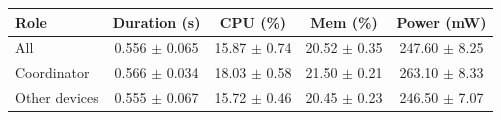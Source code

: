 \begin{tabular}{lcccc}
\hline
\textbf{Role} & \textbf{Duration (s)} & \textbf{CPU (\%)} & \textbf{Mem (\%)} & \textbf{Power (mW)} \\
\hline
All & 0.556 $\pm$ 0.065 & 15.87 $\pm$ 0.74 & 20.52 $\pm$ 0.35 & 247.60 $\pm$ 8.25 \\
Coordinator & 0.566 $\pm$ 0.034 & 18.03 $\pm$ 0.58 & 21.50 $\pm$ 0.21 & 263.10 $\pm$ 8.33 \\
Other devices & 0.555 $\pm$ 0.067 & 15.72 $\pm$ 0.46 & 20.45 $\pm$ 0.23 & 246.50 $\pm$ 7.07 \\
\hline
\end{tabular}
